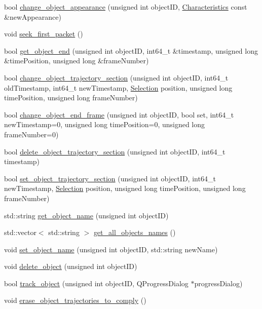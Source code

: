 \begin{DoxyCompactItemize}
\item 
bool \hyperlink{classVideoTracker_a2769b71f5bba913e4cecba2823702eda}{change\+\_\+object\+\_\+appearance} (unsigned int object\+I\+D, \hyperlink{structCharacteristics}{Characteristics} const \&new\+Appearance)
\item 
void \hyperlink{classVideoTracker_ab6a9679646906aea8d6d7730b78e0948}{seek\+\_\+first\+\_\+packet} ()
\item 
bool \hyperlink{classVideoTracker_a50e5a543b8e31e121ac58a159f2384b2}{get\+\_\+object\+\_\+end} (unsigned int object\+I\+D, int64\+\_\+t \&timestamp, unsigned long \&time\+Position, unsigned long \&frame\+Number)
\item 
bool \hyperlink{classVideoTracker_abfdad55bb49e7b2c45140d884856c6bc}{change\+\_\+object\+\_\+trajectory\+\_\+section} (unsigned int object\+I\+D, int64\+\_\+t old\+Timestamp, int64\+\_\+t new\+Timestamp, \hyperlink{structSelection}{Selection} position, unsigned long time\+Position, unsigned long frame\+Number)
\item 
bool \hyperlink{classVideoTracker_ad238b49118cb9c288e4543b509e1e6f8}{change\+\_\+object\+\_\+end\+\_\+frame} (unsigned int object\+I\+D, bool set, int64\+\_\+t new\+Timestamp=0, unsigned long time\+Position=0, unsigned long frame\+Number=0)
\item 
bool \hyperlink{classVideoTracker_afef3f2aad3fc3eadc65400eb757d0e47}{delete\+\_\+object\+\_\+trajectory\+\_\+section} (unsigned int object\+I\+D, int64\+\_\+t timestamp)
\item 
bool \hyperlink{classVideoTracker_a67a4e9d0a476dc6bb04047c8fdc94d5b}{set\+\_\+object\+\_\+trajectory\+\_\+section} (unsigned int object\+I\+D, int64\+\_\+t new\+Timestamp, \hyperlink{structSelection}{Selection} position, unsigned long time\+Position, unsigned long frame\+Number)
\item 
std\+::string \hyperlink{classVideoTracker_a9f967e75fa324d4fc17a7875fe2bef1e}{get\+\_\+object\+\_\+name} (unsigned int object\+I\+D)
\item 
std\+::vector$<$ std\+::string $>$ \hyperlink{classVideoTracker_a6a8d40056c7a309292eb627d84576d3a}{get\+\_\+all\+\_\+objects\+\_\+names} ()
\item 
void \hyperlink{classVideoTracker_ad37c9432c33014bdb3476b31fe16a4ce}{set\+\_\+object\+\_\+name} (unsigned int object\+I\+D, std\+::string new\+Name)
\item 
void \hyperlink{classVideoTracker_a10a09bf6a8f67c378c3bfa60255a007a}{delete\+\_\+object} (unsigned int object\+I\+D)
\item 
bool \hyperlink{classVideoTracker_a7b6b59eea6ef8210a234726524447d9f}{track\+\_\+object} (unsigned int object\+I\+D, Q\+Progress\+Dialog $\ast$progress\+Dialog)
\item 
void \hyperlink{classVideoTracker_a7400741f360deb50b33bc9b96aef9083}{erase\+\_\+object\+\_\+trajectories\+\_\+to\+\_\+comply} ()
\end{DoxyCompactItemize}


